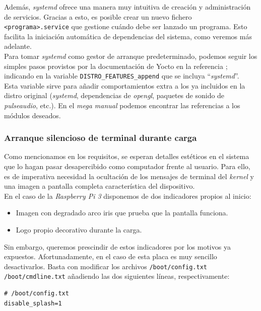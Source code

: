 Además, \textit{systemd} ofrece una manera muy intuitiva de creación y administración de servicios. Gracias a esto, es posible crear un nuevo fichero \texttt{<programa>.service} que gestione cuándo debe ser lanzado un programa. Esto facilita la iniciación automática de dependencias del sistema, como veremos más adelante.\\

Para tomar \textit{systemd} como gestor de arranque predeterminado, podemos seguir los simples pasos provistos por la documentación de Yocto en la referencia \cite{systemd-yocto-project}; indicando en la variable \texttt{DISTRO\_FEATURES\_append} que se incluya ``\textit{systemd}''.\\

Esta variable sirve para añadir comportamientos extra a los ya incluidos en la distro original (\textit{systemd}, dependencias de \textit{opengl}, paquetes de sonido de \textit{pulseaudio}, etc.). En el \textit{mega manual} podemos encontrar las referencias a los módulos deseados.

\subsubsection{Arranque silencioso de terminal durante carga}

Como mencionamos en los requisitos, se esperan detalles estéticos en el sistema que lo hagan pasar desapercibido como computador frente al usuario. Para ello, es de imperativa necesidad la ocultación de los mensajes de terminal del \textit{kernel} y una imagen a pantalla completa característica del dispositivo.\\

En el caso de la \textit{Raspberry Pi 3} disponemos de dos indicadores propios al inicio:
\begin{itemize}
	\item Imagen con degradado arco iris que prueba que la pantalla funciona.
	\item Logo propio decorativo durante la carga.
\end{itemize}

Sin embargo, queremos prescindir de estos indicadores por los motivos ya expuestos. Afortunadamente, en el caso de esta placa es muy sencillo desactivarlos. Basta con modificar los archivos \texttt{/boot/config.txt} \texttt{/boot/cmdline.txt} añadiendo las dos siguientes líneas, respectivamente:

\begin{lstlisting}
# /boot/config.txt
disable_splash=1
\end{lstlisting}

